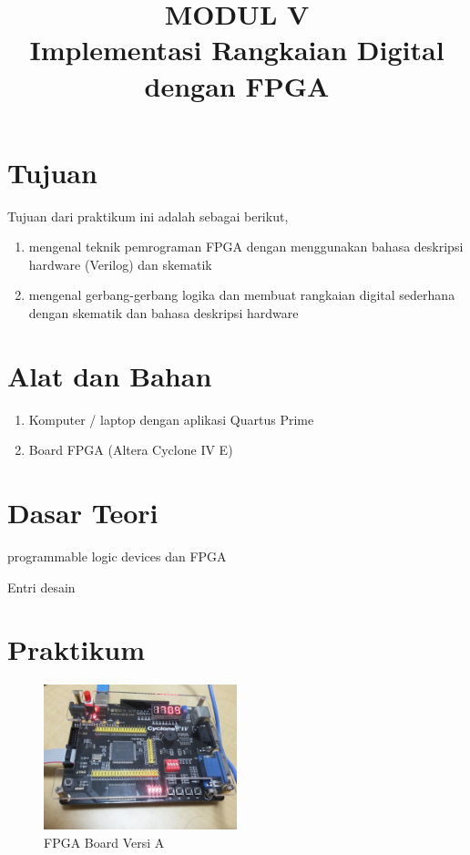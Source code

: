 \documentclass[a4paper,12pt,bahasa]{extarticle}
\begin{document}
\title{MODUL V \\
Implementasi Rangkaian Digital dengan FPGA}
\author{}
\date{}
\maketitle

\section{Tujuan}

Tujuan dari praktikum ini adalah sebagai berikut,
\begin{enumerate}
\item mengenal teknik pemrograman FPGA dengan menggunakan bahasa deskripsi hardware (Verilog)
dan skematik
\item mengenal gerbang-gerbang logika dan membuat rangkaian digital sederhana dengan
skematik dan bahasa deskripsi hardware
\end{enumerate}



\section{Alat dan Bahan}

\begin{enumerate}
\item Komputer / laptop dengan aplikasi Quartus Prime
\item Board FPGA (Altera Cyclone IV E)
\end{enumerate}

\section{Dasar Teori}

programmable logic devices dan FPGA

Entri desain





\section{Praktikum}

\begin{figure}[H]
{\centering
\includegraphics[width=0.5\textwidth]{images/foto_FPGA_v1.jpg}
\par}
\caption{FPGA Board Versi A}
\end{figure}
\end{document}
